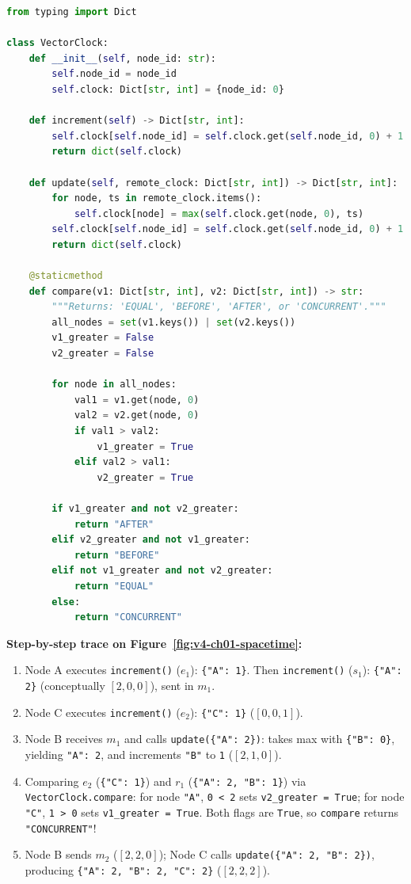 \begin{lstlisting}[language=Python, caption={Vector Clock Implementation with Conflict Detection in Python}]
from typing import Dict

class VectorClock:
    def __init__(self, node_id: str):
        self.node_id = node_id
        self.clock: Dict[str, int] = {node_id: 0}

    def increment(self) -> Dict[str, int]:
        self.clock[self.node_id] = self.clock.get(self.node_id, 0) + 1
        return dict(self.clock)

    def update(self, remote_clock: Dict[str, int]) -> Dict[str, int]:
        for node, ts in remote_clock.items():
            self.clock[node] = max(self.clock.get(node, 0), ts)
        self.clock[self.node_id] = self.clock.get(self.node_id, 0) + 1
        return dict(self.clock)

    @staticmethod
    def compare(v1: Dict[str, int], v2: Dict[str, int]) -> str:
        """Returns: 'EQUAL', 'BEFORE', 'AFTER', or 'CONCURRENT'."""
        all_nodes = set(v1.keys()) | set(v2.keys())
        v1_greater = False
        v2_greater = False

        for node in all_nodes:
            val1 = v1.get(node, 0)
            val2 = v2.get(node, 0)
            if val1 > val2:
                v1_greater = True
            elif val2 > val1:
                v2_greater = True

        if v1_greater and not v2_greater:
            return "AFTER"
        elif v2_greater and not v1_greater:
            return "BEFORE"
        elif not v1_greater and not v2_greater:
            return "EQUAL"
        else:
            return "CONCURRENT"
\end{lstlisting}

\textbf{Step-by-step trace on Figure~\ref{fig:v4-ch01-spacetime}:}
\begin{enumerate}[leftmargin=18pt]
  \item Node A executes \texttt{increment()} ($e_1$): \texttt{\{"A": 1\}}. Then \texttt{increment()} ($s_1$): \texttt{\{"A": 2\}} (conceptually $[2,0,0]$), sent in $m_1$.
  \item Node C executes \texttt{increment()} ($e_2$): \texttt{\{"C": 1\}} ($[0,0,1]$).
  \item Node B receives $m_1$ and calls \texttt{update(\{"A": 2\})}: takes max with \texttt{\{"B": 0\}}, yielding \texttt{"A": 2}, and increments \texttt{"B"} to \texttt{1} ($[2,1,0]$).
  \item Comparing $e_2$ (\texttt{\{"C": 1\}}) and $r_1$ (\texttt{\{"A": 2, "B": 1\}}) via \texttt{VectorClock.compare}: for node \texttt{"A"}, \texttt{0 < 2} sets \texttt{v2\_greater = True}; for node \texttt{"C"}, \texttt{1 > 0} sets \texttt{v1\_greater = True}. Both flags are \texttt{True}, so \texttt{compare} returns \texttt{"CONCURRENT"}!
  \item Node B sends $m_2$ ($[2,2,0]$); Node C calls \texttt{update(\{"A": 2, "B": 2\})}, producing \texttt{\{"A": 2, "B": 2, "C": 2\}} ($[2,2,2]$).
\end{enumerate}

